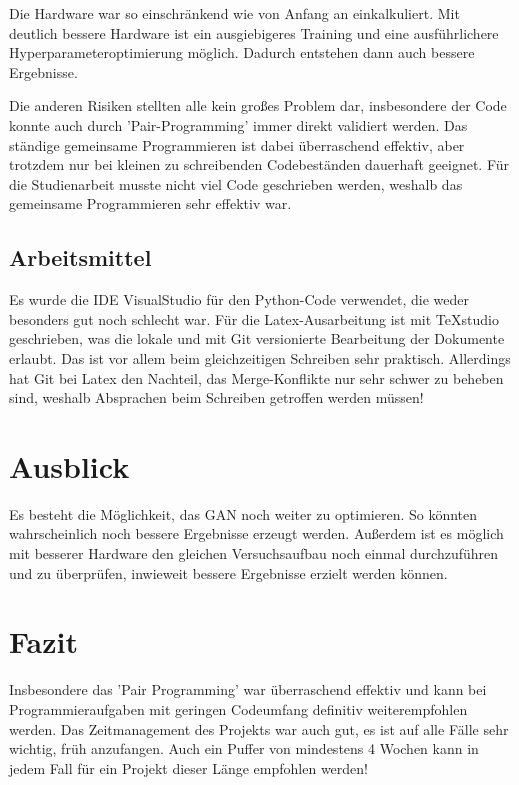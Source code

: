 Die Hardware war so einschränkend wie von Anfang an einkalkuliert.
Mit deutlich bessere Hardware ist ein ausgiebigeres Training und eine ausführlichere Hyperparameteroptimierung möglich.
Dadurch entstehen dann auch bessere Ergebnisse.
\newline

Die anderen Risiken stellten alle kein großes Problem dar, insbesondere der Code konnte auch durch 'Pair-Programming' immer direkt validiert werden.
Das ständige gemeinsame Programmieren ist dabei überraschend effektiv, aber trotzdem nur bei kleinen zu schreibenden Codebeständen dauerhaft geeignet.
Für die Studienarbeit musste nicht viel Code geschrieben werden, weshalb das gemeinsame Programmieren sehr effektiv war.
\subsection{Arbeitsmittel}
Es wurde die IDE VisualStudio für den Python-Code verwendet, die weder besonders gut noch schlecht war.
Für die Latex-Ausarbeitung ist mit TeXstudio geschrieben, was die lokale und mit Git versionierte Bearbeitung der Dokumente erlaubt.
Das ist vor allem beim gleichzeitigen Schreiben sehr praktisch.
Allerdings hat Git bei Latex den Nachteil, das Merge-Konflikte nur sehr schwer zu beheben sind, weshalb Absprachen beim Schreiben getroffen werden müssen!

\section{Ausblick}
Es besteht die Möglichkeit, das GAN noch weiter zu optimieren.
So könnten wahrscheinlich noch bessere Ergebnisse erzeugt werden.
Außerdem ist es möglich mit besserer Hardware den gleichen Versuchsaufbau noch einmal durchzuführen und zu überprüfen, inwieweit bessere Ergebnisse erzielt werden können.

\section{Fazit}
Insbesondere das 'Pair Programming' war überraschend effektiv und kann bei Programmieraufgaben mit geringen Codeumfang definitiv weiterempfohlen werden.
Das Zeitmanagement des Projekts war auch gut, es ist auf alle Fälle sehr wichtig, früh anzufangen.
Auch ein Puffer von mindestens 4 Wochen kann in jedem Fall für ein Projekt dieser Länge empfohlen werden!